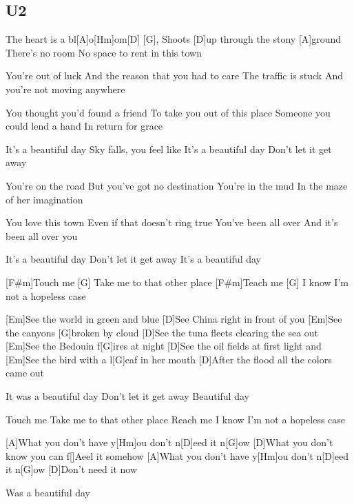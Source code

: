 \documentclass{article}
\begin{document}
\subsection*{U2}
\begin{guitar}

		
	The heart is a bl[A]o[Hm]om[D] [G],
	Shoots [D]up through the stony [A]ground
	There's no room
	No space to rent in this town

	You're out of luck
	And the reason that you had to care
	The traffic is stuck
	And you're not moving anywhere

	You thought you'd found a friend
	To take you out of this place
	Someone you could lend a hand
	In return for grace

	It's a beautiful day
	Sky falls, you feel like
	It's a beautiful day
	Don't let it get away

	You're on the road
	But you've got no destination
	You're in the mud
	In the maze of her imagination

	You love this town
	Even if that doesn't ring true
	You've been all over
	And it's been all over you

	It's a beautiful day
	Don't let it get away
	It's a beautiful day

	[F#m]Touch me [G] 
	Take me to that other place
	[F#m]Teach me [G] 
	I know I'm not a hopeless case

	[Em]See the world in green and blue
	[D]See China right in front of you
	[Em]See the canyons [G]broken by cloud
	[D]See the tuna fleets clearing the sea out
	[Em]See the Bedouin f[G]ires at night
	[D]See the oil fields at first light and
	[Em]See the bird with a l[G]eaf in her mouth
	[D]After the flood all the colors came out

	It was a beautiful day
	Don't let it get away
	Beautiful day

	Touch me
	Take me to that other place
	Reach me
	I know I'm not a hopeless case

	[A]What you don't have y[Hm]ou don't n[D]eed it n[G]ow
	[D]What you don't know you can f[]Aeel it somehow
	[A]What you don't have y[Hm]ou don't n[D]eed it n[G]ow
	[D]Don't need it now

	Was a beautiful day 
	
\end{guitar}
\end{document}
